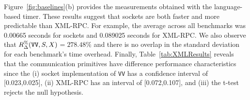 \documentclass{sig-alternate}
\begin{document}

\sloppy Figure~\ref{fig:baselines}(b) provides the measurements
obtained with the language-based timer.  These results suggest that
sockets are both faster and more predictable than XML-RPC.  For
example, the average across all benchmarks was 0.00665 seconds for
sockets and 0.089025 seconds for XML-RPC.  We also observe that
{\small $R_\Delta^\%(\mbox{{\tt VV}},S,X)$}$=278.48\%$ and there is no
overlap in the standard deviation for each benchmark's time overhead.
Finally, Table~\ref{tab:XMLResults} reveals that the communication
primitives have difference performance characteristics since the (i)
socket implementation of \texttt{VV} has a confidence interval of
[0.023,0.025], (ii) XML-RPC has an interval of [0.072,0.107], and
(iii) the t-test rejects the null hypothesis.







\end{document}
